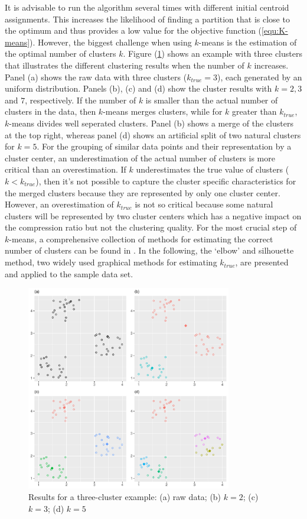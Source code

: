 It is advisable to run the algorithm several times with different initial centroid assignments. This increases the likelihood of finding a partition that is close to the optimum and thus provides a low value for the objective function (\ref{equ:K-means}). However, the biggest challenge when using $k$-means is the estimation of the optimal number of clusters $k$. Figure (\ref{fig:cluster_centers}) shows an example with three clusters that illustrates the different clustering results when the number of $k$  increases. Panel (a) shows the raw data with three clusters ($k_{true} = 3$), each generated by an uniform distribution. Panels (b), (c) and (d) show the cluster results with $k = 2, 3 $ and $7$, respectively. If the number of $k$ is smaller than the actual number of clusters in the data, then $k$-means merges clusters, while for $k$ greater than $k_{true}$, $k$-means divides well seperated clusters. Panel (b) shows a merge of the clusters at the top right, whereas panel (d) shows an artificial split of two natural clusters for $k=5$. For the grouping of similar data points and their representation by a cluster center, an underestimation of the actual number of clusters is more critical than an overestimation. If $k$ underestimates the true value of clusters ($k < k_{true}$), then it's  not possible to capture the cluster specific characteristics for the merged clusters because they are represented by only one cluster center. However, an overestimation of $k_{true}$ is not so critical because some natural clusters will be represented by two cluster centers which has a negative impact on the compression ratio but not the clustering quality. For the most crucial step of $k$-means, a comprehensive collection of methods for estimating the correct number of clusters can be found in \cite{milligan1985examination}. In the following, the `elbow' and silhouette method, two widely used graphical methods for estimating $k_{true}$, are presented and applied to the sample data set. 
\begin{figure}
	\centering
	\includegraphics[width=0.8\textwidth]{figures/chapter_k_means/cluster_centers}
	\caption{Results for a three-cluster example: (a) raw data; (b) $k=2$; (c) $k=3$; (d) $k=5$}
	\label{fig:cluster_centers}
\end{figure}


